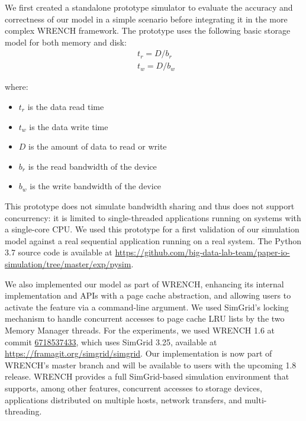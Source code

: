 \documentclass[conference]{IEEEtran}
\newcommand{\simgrid}{SimGrid\xspace}
\newcommand{\wrench}{WRENCH\xspace}
\begin{document}
            We first created a standalone prototype
            simulator to evaluate the accuracy and correctness of our
            model in a simple scenario before integrating it in the more complex
            \wrench framework.
            The prototype uses the following basic storage model for
            both memory and disk:
            \begin{align*}
                & t_{r} = D / b_r \\
                & t_{w} = D / b_w\
            \end{align*}

            where:
            \begin{itemize}
                \item $t_{r}$ is the data read time
                \item $t_{w}$ is the data write time
                \item $D$ is the amount of data to read or write
                \item $b_r$ is the read bandwidth of the device
                \item $b_w$ is the write bandwidth of the device
            \end{itemize}

            This prototype does not simulate  bandwidth sharing and thus does not support
            concurrency: it is limited to single-threaded applications running on systems
            with a single-core CPU. We used this prototype for a first validation of our simulation
            model against a real sequential application running on a real system.
            The Python 3.7 source code is available at
            \url{https://github.com/big-data-lab-team/paper-io-simulation/tree/master/exp/pysim}.

            We also implemented our model as part of \wrench, enhancing its
            internal implementation and APIs with a page cache abstraction,
            and allowing users to activate the feature via a command-line
            argument. We used SimGrid's locking mechanism to handle
            concurrent accesses to page cache LRU lists by the two Memory
            Manager threads. For the experiments, we used
            \wrench 1.6 at commit
            \href{https://github.com/wrench-project/wrench/tree/67185374330d2c4bf274fce222c937e838df5b03}{6718537433},
            which uses \simgrid 3.25, available at
            \url{https://framagit.org/simgrid/simgrid}. Our implementation
            is now part of \wrench's master branch and will be available to
            users with the upcoming 1.8 release. \wrench provides a full \simgrid-based simulation 
            environment that supports, among other features, concurrent accesses to storage devices, 
            applications distributed on multiple hosts, network transfers, 
            and multi-threading. 
\end{document}
